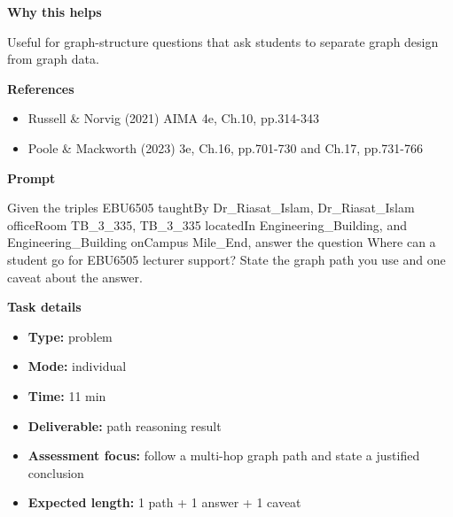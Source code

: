 \documentclass[11pt]{article}
\begin{document}
\begin{tcolorbox}[colback=white,colframe=MidnightBlue,title={Q1 Core Concept Check},fonttitle=\bfseries,breakable]
{\large\bfseries\color{MidnightBlue} Why this helps}\par\medskip
Useful for graph-structure questions that ask students to separate graph design from graph data.

{\large\bfseries\color{MidnightBlue} References}\par\medskip
\begin{itemize}\item Russell \& Norvig (2021) AIMA 4e, Ch.10, pp.314-343
\item Poole \& Mackworth (2023) 3e, Ch.16, pp.701-730 and Ch.17, pp.731-766\end{itemize}
\end{tcolorbox}

\begin{tcolorbox}[colback=white,colframe=MidnightBlue,title={Q2 Structured Problem},fonttitle=\bfseries,breakable]
\begin{center}
\end{center}

{\large\bfseries\color{MidnightBlue} Prompt}\par\medskip
Given the triples EBU6505 taughtBy Dr\_Riasat\_Islam, Dr\_Riasat\_Islam officeRoom TB\_3\_335, TB\_3\_335 locatedIn Engineering\_Building, and Engineering\_Building onCampus Mile\_End, answer the question Where can a student go for EBU6505 lecturer support? State the graph path you use and one caveat about the answer.

{\large\bfseries\color{MidnightBlue} Task details}\par\medskip
\begin{itemize}\item \textbf{Type:} problem
\item \textbf{Mode:} individual
\item \textbf{Time:} 11 min
\item \textbf{Deliverable:} path reasoning result
\item \textbf{Assessment focus:} follow a multi-hop graph path and state a justified conclusion
\item \textbf{Expected length:} 1 path + 1 answer + 1 caveat\end{itemize}


\end{tcolorbox}
\end{document}
